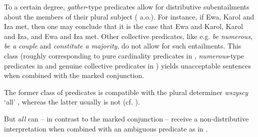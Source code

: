 \documentclass[output=paper]{langscibook}
\begin{document}
\noindent To a certain degree, \textit{gather}-type predicates allow for distributive subentailments about the members of their plural subject (\citealt{Dowty:1987, Winter:2002, Hackl:2002, Champollion:2010} a.o.). For instance, if Ewa, Karol and Iza met, then one may conclude that it is the case that Ewa and Karol, Karol and Iza, and Ewa and Iza met. Other collective predicates, like e.g. \textit{be numerous}, \textit{be a couple} and \textit{constitute a majority}, do not allow for such entailments. This class (roughly corresponding to pure cardinality predicates in \citealt{Dowty:1987}{,} \textit{numerous}-type predicates in \citealt{Champollion:2010} and genuine collective predicates in \citealt{Hackl:2002}) yields unacceptable sentences when combined with the marked conjunction.

{\judgewidth{\#}%
\label{ros:num}
\label{ros:couple} 
\label{ros:majority} 
\z}

\noindent The former class of predicates is compatible with the plural determiner \textit{wszyscy} `all' , whereas the latter usually is not  (cf. \citealt{Dowty:1987}).

{\judgewidth{\#}
\z}

\noindent But \textit{all} can -- in contrast to the marked conjunction -- receive a non-distributive interpretation when combined with an ambiguous predicate as in .
\end{document}
